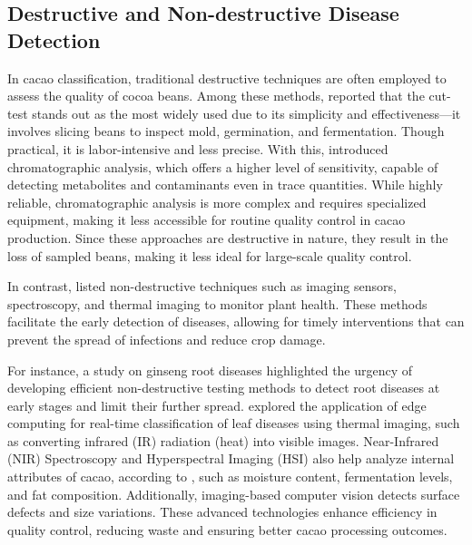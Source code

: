 \subsection{Destructive and Non-destructive Disease Detection}
In cacao classification, traditional destructive techniques are often employed to assess the quality of cocoa beans. Among these methods, \cite{Nguyen2022} reported that the cut-test stands out as the most widely used due to its simplicity and effectiveness—it involves slicing beans to inspect mold, germination, and fermentation. Though practical, it is labor-intensive and less precise. With this, \cite{Quelal2020} introduced chromatographic analysis, which offers a higher level of sensitivity, capable of detecting metabolites and contaminants even in trace quantities. While highly reliable, chromatographic analysis is more complex and requires specialized equipment, making it less accessible for routine quality control in cacao production. Since these approaches are destructive in nature, they result in the loss of sampled beans, making it less ideal for large-scale quality control.

In contrast, \cite{Alvarado2023} listed non-destructive techniques such as imaging sensors, spectroscopy, and thermal imaging to monitor plant health. These methods facilitate the early detection of diseases, allowing for timely interventions that can prevent the spread of infections and reduce crop damage.

For instance, a study on ginseng root diseases highlighted the urgency of developing efficient non-destructive testing methods to detect root diseases at early stages and limit their further spread. \cite{Silva2024} explored the application of edge computing for real-time classification of leaf diseases using thermal imaging, such as converting infrared (IR) radiation (heat) into visible images. Near-Infrared (NIR) Spectroscopy and Hyperspectral Imaging (HSI) also help analyze internal attributes of cacao, according to \cite{Alvarado2023}, such as moisture content, fermentation levels, and fat composition. Additionally, imaging-based computer vision detects surface defects and size variations. These advanced technologies enhance efficiency in quality control, reducing waste and ensuring better cacao processing outcomes.

